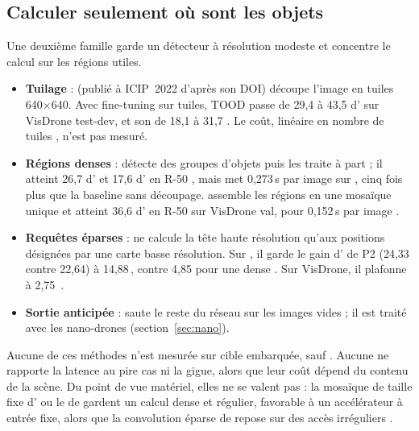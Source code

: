 \subsection{Calculer seulement où sont les objets}

Une deuxième famille garde un détecteur à résolution modeste et concentre le calcul sur
les régions utiles.
\begin{itemize}
  \item \textbf{Tuilage} :  \citep{arxiv-2202.06934-slicing-aided-hyper-inference-fine}\pp{}
    (publié à ICIP~2022 d'après son DOI) découpe l'image en tuiles 640$\times$640. Avec
    fine-tuning sur tuiles, TOOD passe de 29,4 à 43,5 d' sur VisDrone test-dev, et
    son  de 18,1 à 31,7 . Le coût, linéaire en nombre de tuiles
    , n'est pas mesuré.
  \item \textbf{Régions denses} : 
    \citep{arxiv-1904.08008-clustered-object-detection-aerial-images}\pp{} détecte des
    groupes d'objets puis les traite à part ; il atteint 26,7 d' et 17,6 d' en R-50
    , mais met 0,273\,s par image sur , cinq fois plus que la
    baseline sans découpage. 
    \citep{arxiv-2112.10415-ufpmp-det-accurate-efficient-object}\pp{} assemble les régions
    en une mosaïque unique et atteint 36,6 d' en R-50 sur VisDrone val, pour 0,152\,s par
    image .
  \item \textbf{Requêtes éparses} : 
    \citep{arxiv-2103.09136-querydet-cascaded-sparse-query-accelerating}\pp{} ne calcule
    la tête haute résolution qu'aux positions désignées par une carte basse résolution. Sur
    , il garde le gain d' de P2 (24,33 contre 22,64) à 14,88\,, contre 4,85
    pour une  dense . Sur VisDrone, il plafonne à 2,75\,
    .
  \item \textbf{Sortie anticipée} : 
    \citep{arxiv-2603.28149-blankskip-early-exit-object-detection}\pp{} saute le reste du
    réseau sur les images vides ; il est traité avec les nano-drones
    (section~\ref{sec:nano}).
\end{itemize}
Aucune de ces méthodes n'est mesurée sur cible embarquée, sauf . Aucune ne
rapporte la latence au pire cas ni la gigue, alors que leur coût dépend du contenu de la
scène. Du point de vue matériel, elles ne se valent pas : la mosaïque de taille fixe
d' ou le  de  gardent un calcul dense et régulier, favorable à un
accélérateur à entrée fixe, alors que la convolution éparse de  repose sur des
accès irréguliers \deduit.


